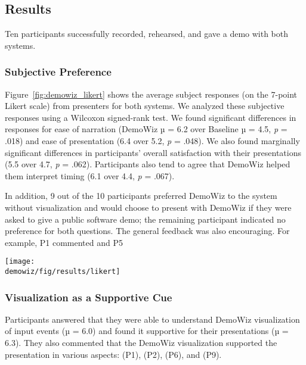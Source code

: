 
\subsection{Results}
Ten participants successfully recorded, rehearsed, and gave a demo with both systems.

\subsubsection{Subjective Preference}
Figure~\ref{fig:demowiz_likert} shows the average subject responses (on the 7-point Likert scale) from presenters for both systems. We analyzed these subjective responses using a Wilcoxon signed-rank test. We found significant differences in responses for ease of narration (DemoWiz µ = 6.2 over Baseline µ = 4.5, \textit{p} = .018) and ease of presentation (6.4 over 5.2, \textit{p} = .048). We also found marginally significant differences in participants' overall satisfaction with their presentations (5.5 over 4.7, \textit{p} = .062). Participants also tend to agree that DemoWiz helped them interpret timing (6.1 over 4.4, \textit{p} = .067).

In addition, 9 out of the 10 participants preferred DemoWiz to the system without visualization and would choose to present with DemoWiz if they were asked to give a public software demo; the remaining participant indicated no preference for both questions. The general feedback was also encouraging. For example, P1 commented  and P5 

\begin{figure*}[t]
  \centering
  \texttt{[image: \\demowiz/fig/results/likert]}
  \caption{User feedback from questionnaire on the 7-point Likert scale.}
  \label{fig:demowiz_likert}
\end{figure*}

\subsubsection{Visualization as a Supportive Cue}
Participants answered that they were able to understand DemoWiz visualization of input events (µ = 6.0) and found it supportive for their presentations (µ = 6.3). They also commented that the DemoWiz visualization supported the presentation in various aspects:  (P1),  (P2),  (P6), and  (P9).

